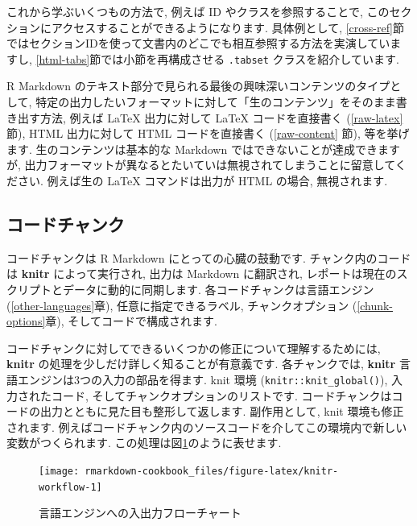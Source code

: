 \documentclass[
  11pt,
  lualatex,
  ja=standard]{bxjsreport}
\begin{document}
これから学ぶいくつもの方法で, 例えば ID やクラスを参照することで, このセクションにアクセスすることができるようになります. 具体例として, \ref{cross-ref}節ではセクションIDを使って文書内のどこでも相互参照する方法を実演していますし, \ref{html-tabs}節では小節を再構成させる \texttt{.tabset} クラスを紹介しています.

R Markdown のテキスト部分で見られる最後の興味深いコンテンツのタイプとして, 特定の出力したいフォーマットに対して「生のコンテンツ」をそのまま書き出す方法, 例えば LaTeX 出力に対して LaTeX コードを直接書く (\ref{raw-latex} 節), HTML 出力に対して HTML コードを直接書く (\ref{raw-content} 節), 等を挙げます. 生のコンテンツは基本的な Markdown ではできないことが達成できますが, 出力フォーマットが異なるとたいていは無視されてしまうことに留意してください. 例えば生の LaTeX コマンドは出力が HTML の場合, 無視されます.

\hypertarget{code-chunks}{%
\subsection{コードチャンク}\label{code-chunks}}

コードチャンクは R Markdown にとっての心臓の鼓動です. チャンク内のコードは \textbf{knitr} によって実行され, 出力は Markdown に翻訳され, レポートは現在のスクリプトとデータに動的に同期します. 各コードチャンクは言語エンジン (\ref{other-languages}章), 任意に指定できるラベル, チャンクオプション (\ref{chunk-options}章), そしてコードで構成されます.

コードチャンクに対してできるいくつかの修正について理解するためには, \textbf{knitr} の処理を少しだけ詳しく知ることが有意義です. 各チャンクでは, \textbf{knitr} 言語エンジンは3つの入力の部品を得ます. knit 環境 (\texttt{knitr::knit\_global()}), 入力されたコード, そしてチャンクオプションのリストです. コードチャンクはコードの出力とともに見た目も整形して返します. 副作用として, knit 環境も修正されます. 例えばコードチャンク内のソースコードを介してこの環境内で新しい変数がつくられます. この処理は図\ref{fig:knitr-workflow}のように表せます.

\begin{figure}

{\centering \texttt{[image: rmarkdown-cookbook\_files/figure-latex/knitr-workflow-1]} 

}

\caption{言語エンジンへの入出力フローチャート}\label{fig:knitr-workflow}
\end{figure}
\end{document}
